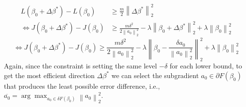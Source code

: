 \documentclass[11pt]{article}
\theoremstyle{plain}
\theoremstyle{definition}
\newcommand{\norm}[1]{\left\lVert #1 \right\rVert}
\newcommand{\1}{\mathbf{1}}
\begin{document}
\begin{align}
L(\beta_0 + \Delta \beta^*)-L(\beta_0) &\geq \frac{m}{2}\norm{\Delta \beta^*}^2_{2} \nonumber \\
\iff J(\beta_0 + \Delta \beta^*)-J(\beta_0) &\geq  \frac{m\delta^2}{2 \norm{a_0}^2_{2}} -\lambda \norm{\beta_0+\Delta \beta^*}_2^2 + \lambda \norm{\beta_0}_2^2  
\end{align}
\begin{equation}
    \label{ineq:lower_bound_J_for_GLM}
    \iff \boxed{J(\beta_0 + \Delta \beta^*)-J(\beta_0) \geq  \frac{m\delta^2}{2 \norm{a_0}^2_{2}} -\lambda \norm{\beta_0-\frac{\delta a_0}{\norm{a_0}_{2}^2}}_2^2 + \lambda \norm{\beta_0}_2^2}
\end{equation}
Again, since the constraint is setting the same level $-\delta$ for each lower bound, to get the most efficient direction $\Delta \beta^*$ we can select the subgradient $a_0\in \partial F(\beta_0)$ that produces the least possible error difference, i.e., $\overline{a_0}=\arg\max_{a_0 \in \delta F(\beta_0)} {\norm{a_0}^2_{2}}$.
\end{document}
